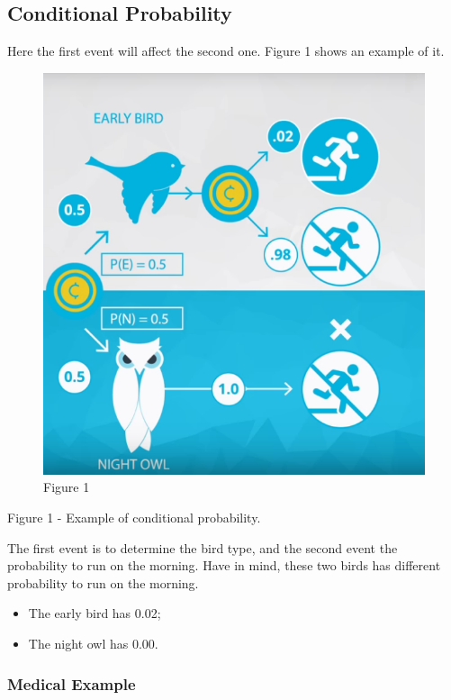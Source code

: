 \documentclass[]{book}
\providecommand{\tightlist}{%
  \setlength{\itemsep}{0pt}\setlength{\parskip}{0pt}}
\begin{document}
\subsection{Conditional Probability}\label{conditional-probability}

Here the first event will affect the second one. Figure 1 shows an
example of it.

\begin{figure}
\centering
\includegraphics{01-img/c4_l6_01.png}
\caption{Figure 1}
\end{figure}

Figure 1 - Example of conditional probability.

The first event is to determine the bird type, and the second event the
probability to run on the morning. Have in mind, these two birds has
different probability to run on the morning.

\begin{itemize}
\tightlist
\item
  The early bird has 0.02;
\item
  The night owl has 0.00.
\end{itemize}

\subsubsection{Medical Example}\label{medical-example}
\end{document}
